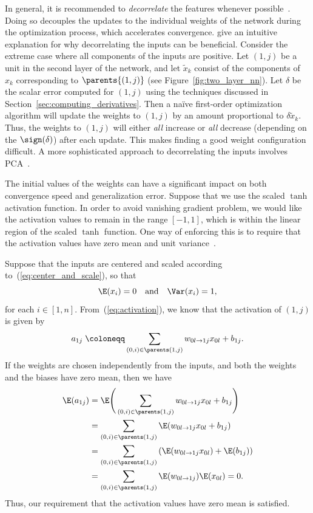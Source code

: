 \documentclass[11pt,a4paper]{article}
\numberwithin{equation}{section}
\newcommand{\weight}[2]{w_{#1 \rightarrow #2}}
\begin{document}
In general, it is recommended to \emph{decorrelate} the features whenever
possible~\citep{lecun-98b}. Doing so decouples the updates to the individual
weights of the network during the optimization process, which accelerates
convergence. \citet{lecun-98b} give an intuitive explanation for why
decorrelating the inputs can be beneficial. Consider the extreme case where all
components of the inputs are positive. Let $(1, j)$ be a unit in the second
layer of the network, and let $\tilde{x}_k$ consist of the components of $x_k$
corresponding to $\parents{(1, j)}$ (see Figure~\ref{fig:two_layer_nn}). Let
$\delta$ be the scalar error computed for $(1, j)$ using the techniques
discussed in Section~\ref{sec:computing_derivatives}. Then a na\"{i}ve
first-order optimization algorithm will update the weights to $(1, j)$ by an
amount proportional to $\delta \tilde{x}_k$. Thus, the weights to $(1, j)$ will
either \emph{all} increase or \emph{all} decrease (depending on the
$\sign(\delta)$) after each update. This makes finding a good weight
configuration difficult. A more sophisticated approach to decorrelating the
inputs involves PCA~\citep{lecun-98b, krizhevsky2012imagenet}.

The initial values of the weights can have a significant impact on both
convergence speed and generalization error. Suppose that we use the scaled
$\tanh$ activation function. In order to avoid vanishing gradient problem, we
would like the activation values to remain in the range $[-1, 1]$, which is
within the linear region of the scaled $\tanh$ function. One way of enforcing
this is to require that the activation values have zero mean and unit
variance~\citep{lecun-98b}.

Suppose that the inputs are centered and scaled according
to~(\ref{eq:center_and_scale}), so that
\[
	\E(x_i) = 0 \quad\text{and}\quad \Var(x_i) = 1,
\]
for each $i \in [1, n]$. From~(\ref{eq:activation}), we know that the activation
of $(1, j)$ is given by
\[
	a_{1j} \;\coloneqq \sum_{(0, i) \in \parents(1, j)} \weight{0l}{1j} x_{0l} + b_{1j}.
\]
If the weights are chosen independently from the inputs, and both the weights
and the biases have zero mean, then we have
\begin{align*}
	\E(a_{1j})
	&= \E\Bigg(\sum_{(0, i) \in \parents(1, j)} \weight{0l}{1j} x_{0l} + b_{1j}\Bigg) \\
	&= \sum_{(0, i) \in \parents(1, j)} \E(\weight{0l}{1j} x_{0l} + b_{1j}) \\
	&= \sum_{(0, i) \in \parents(1, j)} \left(\E(\weight{0l}{1j} x_{0l}) + \E(b_{1j})\right) \\
	&= \sum_{(0, i) \in \parents(1, j)} \E(\weight{0l}{1j}) \E(x_{0l}) = 0.
\end{align*}
Thus, our requirement that the activation values have zero mean is satisfied.
\end{document}
